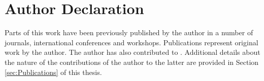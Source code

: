\chapter*{Author Declaration}

Parts of this work have been previously published by the author in a number of journals, international conferences and workshops. Publications \cite{Gamma2006,EOL,EML,Traceability06,RequirementsForDSLs,OCLApps2006,EclipseEpsilon,EWL,ExeedPaper,TVAppsCaseStudy,EASST07,ES2007,NovelFeatures,ETL,ICST08,EUnit,EVL,EpsilonWorkflow} represent original work by the author. The author has also contributed to \cite{ECGF2005,Refine05,ECMDA05,SAC06,CanonicalScheme,Klaus,Gruschko2007,GD07,EGL,DrivalosTraceability08,Paige2008,GD08}. Additional details about the nature of the contributions of the author to the latter are provided in Section \ref{sec:Publications} of this thesis.